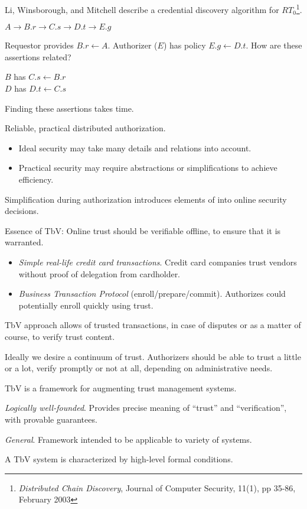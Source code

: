 \documentclass[landscape]{slides}
\begin{document}
Li, Winsborough, and Mitchell describe a credential discovery algorithm for $RT_0$\footnote{\textit{Distributed Chain Discovery}, Journal of Computer Security, 11(1), pp 35-86, February 2003}.

\begin{center}$A \rightarrow B.r \rightarrow C.s \rightarrow D.t \rightarrow E.g$\end{center}

Requestor provides $B.r \leftarrow A$. Authorizer ($E$) has policy $E.g \leftarrow D.t$. How are these assertions related?

$B$ has $C.s \leftarrow B.r$\\
$D$ has $D.t \leftarrow C.s$

Finding these assertions takes time.
\stopslide

Reliable, practical distributed authorization.
\begin{itemize}
\item Ideal security may take many details and relations into account.
\item Practical security may require abstractions or simplifications to achieve efficiency.
\end{itemize}
Simplification during authorization introduces elements of  into online security decisions.

Essence of TbV: Online trust should be verifiable offline, to ensure that it is warranted.
\stopslide

\begin{itemize}
\item \textit{Simple real-life credit card transactions}. Credit card companies trust vendors without proof of delegation from cardholder.
\item \textit{Business Transaction Protocol} (enroll/prepare/commit). Authorizes could potentially enroll quickly using trust.
\end{itemize}
TbV approach allows  of trusted transactions, in case of disputes or as a matter of course, to verify trust content.

Ideally we desire a continuum of trust. Authorizers should be able to trust a little or a lot, verify promptly or not at all, depending on administrative needs.
\stopslide

TbV is a framework for augmenting trust management systems.
\begin{citemize}	
\item \textit{Logically well-founded}. Provides precise meaning of ``trust'' and ``verification'', with provable guarantees.
\item \textit{General}. Framework intended to be applicable to variety of systems.
\end{citemize}
A TbV system is characterized by  high-level formal conditions.
\end{document}
